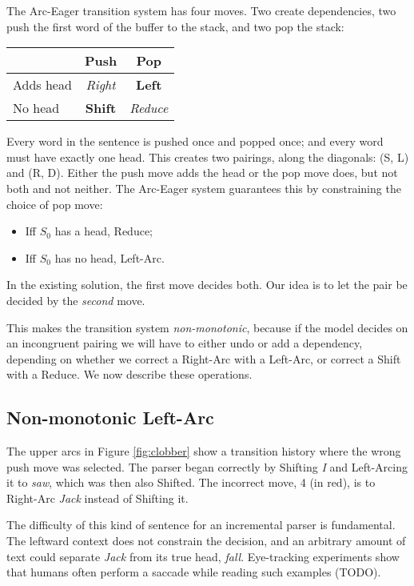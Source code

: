 \documentclass[11pt,letterpaper]{article}
\begin{document}
The Arc-Eager transition system \citep{nivre:04} has four moves. Two create 
dependencies, two push the first word of the buffer to the stack, and two pop 
the stack:

\begin{center}
    \begin{tabular}{l|cc}
             & Push  & Pop    \\
           \hline
           Adds head   & \emph{Right} & \textbf{Left}    \\
            No head    & \textbf{Shift} & \emph{Reduce}   \\
     \end{tabular}
\end{center}

Every word in the sentence is pushed once and popped once; and every
word must have exactly one head. This creates two pairings, along the
diagonals: (S, L) and (R, D).
Either the push move adds the head or the pop move does, but not both and not neither.
The Arc-Eager system guarantees this by constraining the choice of pop move:

\begin{itemize}\setlength{\itemsep}{-2mm}
    \item Iff $S_0$ has a head, Reduce;
    \item Iff $S_0$ has no head, Left-Arc.
\end{itemize}
In the existing solution, the first move decides both.
Our idea is to let the pair be decided by the \emph{second} move.

This makes the transition system \emph{non-monotonic}, because if the model decides
on an incongruent pairing
we will have to either undo or add a
dependency, depending on whether we correct a Right-Arc with a Left-Arc, or correct
a Shift with a Reduce. We now describe these operations.

\subsection{Non-monotonic Left-Arc}

The upper arcs in Figure \ref{fig:clobber} show a transition history where the wrong
push move was selected. The parser began correctly by Shifting \emph{I}
and Left-Arcing it to \emph{saw}, which was then also Shifted. The incorrect move,
4 (in red), is to Right-Arc \emph{Jack} instead of Shifting it.

The difficulty of this kind of sentence for an incremental parser is fundamental.
The leftward context does not constrain the decision, 
and an arbitrary amount of text could separate \emph{Jack} from its true head,
\emph{fall}. Eye-tracking
experiments show that humans often perform a saccade while reading such examples (TODO).
\end{document}
